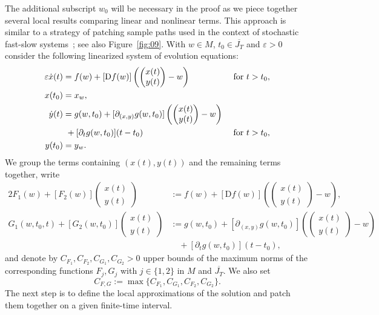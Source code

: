 \documentclass[12pt]{article}
\newcommand{\benn}{\begin{equation*}}
\newcommand{\eenn}{\end{equation*}}
\begin{document}
The additional subscript $w_0$ will be necessary in the proof as we piece
together several local results comparing linear and nonlinear terms. This 
approach is similar to a strategy of patching sample
paths used in the context of stochastic fast-slow 
systems~\cite{BerglundGentz,BerglundGentzKuehn1}; see also Figure~\ref{fig:09}. 
With $w\in M$, $t_0\in \overline{J_T}$ and $\varepsilon>0$ consider the following 
linearized system of evolution equations:
\begin{alignat}{2}
\varepsilon \dot{x}(t)& = f(w) + [\mathrm{D}f(w)]\left(
\left(\begin{matrix} x(t)\\ y(t) \end{matrix}\right) - w\right)
\ && \text{ for }t>t_0,\label{Eq:evol_lin_y_1}\\
x(t_0) &= x_w\label{Eq:evol_lin_y_2},\\
\dot{y}(t) &= g(w,t_0) + [\partial_{(x,y)}g(w,t_0)]\left(
\left(\begin{matrix} x(t)\\ y(t) \end{matrix}\right)- w
\right)\notag \\&\ + [\partial_t g(w,t_0)](t-t_0)
\ && \text{ for }t>t_0,\label{Eq:evol_lin_x_1}\\
y(t_0) &= y_w.\label{Eq:evol_lin_x_2}
\end{alignat}
We group the terms containing $(x(t),y(t))$ and the remaining terms together, write
\begin{alignat*}{2}
F_1(w) + [F_2(w)]
\left(\begin{matrix}x(t)\\y(t)\end{matrix}\right)
&:=f(w) + [\mathrm{D}f(w)]\left(
\left(\begin{matrix}x(t)\\ y(t) \end{matrix}\right)- w\right),\\
G_1(w,t_0,t) + [G_2(w,t_0)]
\left(\begin{matrix} x(t)\\y(t) \end{matrix}\right)&:=g(w,t_0) 
+ [\partial_{(x,y)}g(w,t_0)]\left(
\left(\begin{matrix} x(t)\\ y(t)\end{matrix}\right)- w\right)\\
&\quad + [\partial_t g(w,t_0)](t-t_0),
\end{alignat*}
and denote by $C_{F_1},C_{F_2},C_{G_1},C_{G_2}>0$ upper bounds of the maximum 
norms of the corresponding functions $F_j, G_j$ with $j\in\{1,2\}$ in $M$ and 
$\overline{J_T}$. We also set 
\benn
C_{F,G}:=\max\{C_{F_1},C_{G_1},C_{F_2},C_{G_2}\}.
\eenn
The next step is to define the local approximations of the
solution and patch them together on a given finite-time interval.
\end{document}
